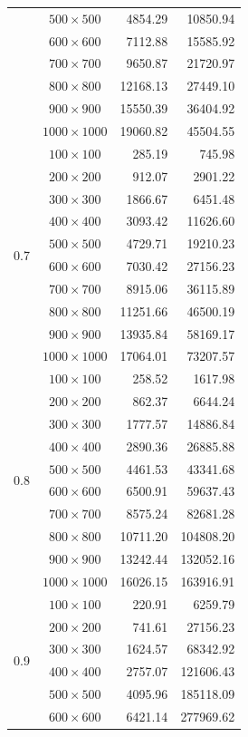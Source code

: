 \documentclass{article}
\begin{document}
\begin{longtable}{|c|c|r|r|}
&$500\times500$ & 4854.29 & 10850.94\\*
&$600\times600$ & 7112.88 & 15585.92\\*
&$700\times700$ & 9650.87 & 21720.97\\*
&$800\times800$ & 12168.13 & 27449.10\\*
&$900\times900$ & 15550.39 & 36404.92\\*
&$1000\times1000$ & 19060.82 & 45504.55\\
\hline
\multirow{10}{*}{0.7}
&$100\times100$ & 285.19 & 745.98\\*
&$200\times200$ & 912.07 & 2901.22\\*
&$300\times300$ & 1866.67 & 6451.48\\*
&$400\times400$ & 3093.42 & 11626.60\\*
&$500\times500$ & 4729.71 & 19210.23\\*
&$600\times600$ & 7030.42 & 27156.23\\*
&$700\times700$ & 8915.06 & 36115.89\\*
&$800\times800$ & 11251.66 & 46500.19\\*
&$900\times900$ & 13935.84 & 58169.17\\*
&$1000\times1000$ & 17064.01 & 73207.57\\
\hline
\multirow{10}{*}{0.8}
&$100\times100$ & 258.52 & 1617.98\\*
&$200\times200$ & 862.37 & 6644.24\\*
&$300\times300$ & 1777.57 & 14886.84\\*
&$400\times400$ & 2890.36 & 26885.88\\*
&$500\times500$ & 4461.53 & 43341.68\\*
&$600\times600$ & 6500.91 & 59637.43\\*
&$700\times700$ & 8575.24 & 82681.28\\*
&$800\times800$ & 10711.20 & 104808.20\\*
&$900\times900$ & 13242.44 & 132052.16\\*
&$1000\times1000$ & 16026.15 & 163916.91\\
\hline
\multirow{10}{*}{0.9}
&$100\times100$ & 220.91 & 6259.79\\*
&$200\times200$ & 741.61 & 27156.23\\*
&$300\times300$ & 1624.57 & 68342.92\\*
&$400\times400$ & 2757.07 & 121606.43\\*
&$500\times500$ & 4095.96 & 185118.09\\*
&$600\times600$ & 6421.14 & 277969.62\\*

\end{longtable}
\end{document}
